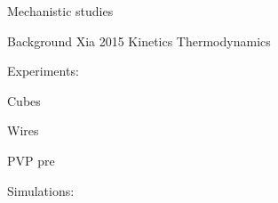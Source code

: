 Mechanistic studies

Background Xia 2015 Kinetics Thermodynamics

Experiments:

Cubes

Wires

PVP pre

Simulations: